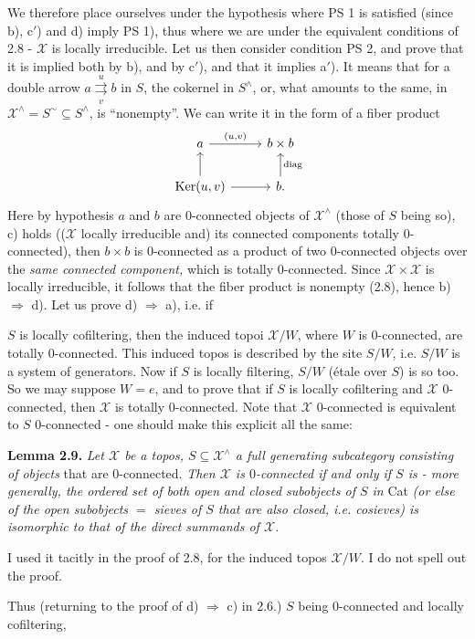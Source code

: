 \documentclass[11pt]{article}
\newcommand{\printedpage}[1]{\marginpar{\footnotesize p.~#1}}
\newcommand{\msp}[1]{\marginpar{\footnotesize [#1]}}
\newcommand{\X}{\mathcal{X}}
\begin{document}
\msp{page 24}We therefore place ourselves under the hypothesis where PS 1 is satisfied (since b), c$'$) and d) imply PS 1), thus where we are under the equivalent conditions of 2.8 - $\X$ is locally irreducible. Let us then consider condition PS 2, and prove that it is implied both by b), and by c$'$), and that it implies a$'$). It means that for a double arrow $a\overset{u}{\underset{v}{\rightrightarrows}}b$ in $S$, the cokernel in $S^\wedge$, or, what amounts to the same, in $\X^\wedge=S^\sim\subseteq S^\wedge$, is ``nonempty''. We can write it in the form of a fiber product
\[
\begin{tikzcd}
a \arrow[r, "{\scriptstyle (u,v)}"] & b\times b \\
\operatorname{Ker}(u,v) \arrow[u] \arrow[r] & b. \arrow[u, "\mathrm{diag}"']
\end{tikzcd}
\]
Here by hypothesis $a$ and $b$ are 0-connected objects of $\X^\wedge$ (those of $S$ being so), c) holds (($\X$ locally irreducible and) its connected components totally 0-connected), then $b\times b$ is 0-connected as a product of two 0-connected objects over the \textit{same connected component,} which is totally 0-connected. Since $\X\times\X$ is locally irreducible, it follows that the fiber product is nonempty (2.8), hence b) $\Longrightarrow$ d). Let us prove d) $\Longrightarrow$ a), i.e. if

\msp{page 25}$S$ is locally cofiltering, then the induced topoi $\X/W$, where $W$ is 0-connected, are totally 0-connected. This induced topos is described by the site $S/W$, i.e. $S/W$ is a system of generators. Now if $S$ is locally filtering, $S/W$ (étale over $S$) is so too. So we may suppose $W=e$, and to prove that if $S$ is locally cofiltering and $\X$ 0-connected, then $\X$ is totally 0-connected. Note that $\X$ 0-connected is equivalent to $S$ 0-connected - one should make this explicit all the same:

\textbf{Lemma 2.9.} \textit{Let $\X$ be a topos, $S\subseteq\X^\wedge$ a full generating subcategory consisting of objects} that are 0-connected. \textit{Then $\X$ is $0$-connected if and only if $S$ is - more generally, the ordered set of both open and closed subobjects of $S$ in} Cat \textit{(or else of the
\printedpage{16}
open subobjects $=$ sieves of $S$ that are also closed, i.e. cosieves) is isomorphic to that of the direct summands of $\X$.}

I used it tacitly in the proof of 2.8, for the induced topos $\X/W$. I do not spell out the proof.

Thus (returning to the proof of d) $\Longrightarrow$ c) in 2.6.) $S$ being 0-connected and locally cofiltering,
\end{document}
